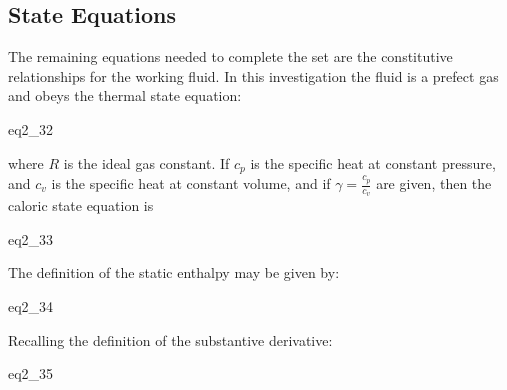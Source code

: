 \subsection{State Equations}

The remaining equations needed to complete the set are the constitutive
relationships for the working fluid. In this investigation the fluid is a
prefect gas and obeys the thermal state equation:

{eq2_32}

where $R$ is the ideal gas constant. If $c_p$ is the specific heat at constant
pressure, and $c_v$ is the specific heat at constant volume, and if $\gamma =
\frac{c_p}{c_v}$ are given, then the caloric state equation is

{eq2_33}

The definition of the static enthalpy may be given by:

{eq2_34}

Recalling the definition of the substantive derivative:

{eq2_35}

